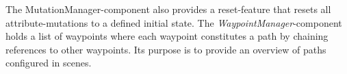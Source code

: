 The MutationManager-component also provides a reset-feature that resets all attribute-mutations to a defined initial state.
The \emph{WaypointManager}-component holds a list of waypoints where each waypoint constitutes a path by chaining references to other waypoints. Its purpose is to provide an overview of paths configured in scenes.
%

